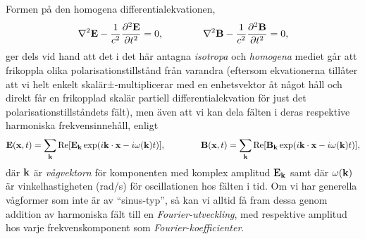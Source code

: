 Formen p{\aa} den homogena differentialekvationen,
$$
  \nabla^2{\bf E} - {{1}\over{c^2}} %
    {{\partial^2{\bf E}}\over{\partial t^2}} = 0,
  \qquad\qquad
  \nabla^2{\bf B} - {{1}\over{c^2}} %
    {{\partial^2{\bf B}}\over{\partial t^2}} = 0,
$$
ger dels vid hand att det i det h{\"a}r antagna {\it isotropa} och
{\it homogena} mediet g{\aa}r att frikoppla olika polarisationstillst{\aa}nd
fr{\aa}n varandra (eftersom ekvationerna till{\aa}ter att vi helt enkelt
skal{\"a}r±-multipli\-cerar med en enhetsvektor {\aa}t n{\aa}got h{\aa}ll
och direkt f{\aa}r en frikopplad skal{\"a}r partiell differentialekvation
f{\"o}r just det polarisationstillst{\aa}ndets f{\"a}lt), men {\"a}ven att
vi kan dela f{\"a}lten i deras respektive harmoniska frekvensinneh{\aa}ll,
enligt
$$
  {\bf E}({\bf x},t)=\sum_{\bf k}
     \Re[{\bf E}_{\bf k}\exp(i{\bf k}\cdot{\bf x}-i\omega({\bf k}) t)],
  \qquad\qquad
  {\bf B}({\bf x},t)=\sum_{\bf k}
     \Re[{\bf B}_{\bf k}\exp(i{\bf k}\cdot{\bf x}-i\omega({\bf k}) t)],
$$
d{\"a}r ${\bf k}$ {\"a}r {\it v{\aa}gvektorn} f{\"o}r komponenten med komplex
amplitud ${\bf E}_{\bf k}$ samt d{\"a}r $\omega({\bf k})$ {\"a}r
vinkelhastigheten (rad/s) f{\"o}r oscillationen hos f{\"a}lten i tid.
Om vi har generella v{\aa}gformer som inte {\"a}r av ``sinus-typ'', s{\aa} kan
vi alltid f{\aa} fram dessa genom addition av harmoniska f{\"a}lt till en
{\it Fourier-utveckling}, med respektive amplitud hos varje frekvenskomponent
som {\it Fourier-koefficienter}.

